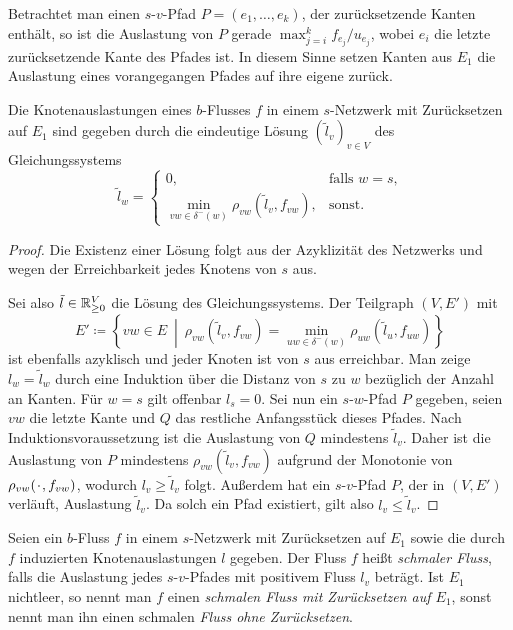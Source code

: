 Betrachtet man einen $s$-$v$-Pfad $P=(e_1, \dots, e_k)$, der zurück\-setzende Kanten ent\-hält, so ist die Auslastung von $P$ gerade $\max_{j=i}^k f_{e_j}/u_{e_j}$, wobei $e_i$ die letzte zurück\-setzende Kante des Pfades ist.
In diesem Sinne setzen Kanten aus $E_1$ die Auslastung eines vorangegangen Pfades auf ihre eigene zurück.

\begin{proposition}\label{prop-congestion-labels-dijkstra}
	Die Knotenauslastungen eines $b$-Flusses $f$ in einem $s$-Netzwerk mit Zurücksetzen auf $E_1$ sind gegeben durch die eindeutige Lösung $(\tilde{l}_v)_{v\in V}$ des Gleichungssystems
	\[
	\tilde{l}_w = \begin{cases}
		0, & \text{falls $w=s$,}\\
		\min_{vw\in \delta^-(w)} \rho_{vw}(\tilde{l}_v, f_{vw}), & \text{sonst.}
	\end{cases}
	\]
\end{proposition}
\begin{proof}
	Die Existenz einer Lösung folgt aus der Azyklizität des Netzwerks und wegen der Erreichbarkeit jedes Knotens von $s$ aus.
	
	Sei also $\tilde{l}\in\mathbb{R}_{\geq 0}^V$ die Lösung des Gleichungssystems.
	Der Teilgraph $(V, E')$ mit \[
	E'\coloneq \left\{ vw\in E ~\middle\vert~ \rho_{vw}(\tilde{l}_v, f_{vw}) = \min_{uw\in\delta^-(w)} \rho_{uw}(\tilde{l}_u, f_{uw}) \right\}
	\]
	ist ebenfalls azyklisch und jeder Knoten ist von $s$ aus erreichbar.
	Man zeige $l_w = \tilde{l}_w$ durch eine Induktion über die Distanz von $s$ zu $w$ bezüglich der Anzahl an Kanten.
	Für $w=s$ gilt offenbar $l_s = 0$.
	Sei nun ein $s$-$w$-Pfad $P$ gegeben, seien $vw$ die letzte Kante und $Q$ das restliche Anfangsstück dieses Pfades.
	Nach Induktionsvoraussetzung ist die Auslastung von $Q$ mindestens $\tilde{l}_v$.
	Daher ist die Auslastung von $P$ mindestens $\rho_{vw}(\tilde{l}_v, f_{vw})$ aufgrund der Monotonie von $\rho_{vw}(\PlH, f_{vw})$, wodurch $l_v \geq \tilde{l}_v$ folgt.
	Außerdem hat ein $s$-$v$-Pfad $P$, der in $(V, E')$ verläuft, Auslastung $\tilde{l}_v$.
	Da solch ein Pfad existiert, gilt also $l_v \leq \tilde{l}_v$.
\end{proof}

\newcommand{\problemThinFlow}{\textsc{ThinFlow}}
\begin{definition}
	Seien ein $b$-Fluss $f$ in einem $s$-Netzwerk mit Zurück\-setzen auf $E_1$ sowie die durch $f$ induzierten Knotenauslastungen $l$ gegeben.
	Der Fluss $f$ heißt \emph{schmaler Fluss}, falls die Auslastung jedes $s$-$v$-Pfades mit positivem Fluss $l_v$ beträgt.
	Ist $E_1$ nichtleer, so nennt man $f$ einen \emph{schmalen Fluss mit Zurücksetzen auf $E_1$}, sonst nennt man ihn einen schmalen\emph{ Fluss ohne Zurücksetzen}.
\end{definition}

